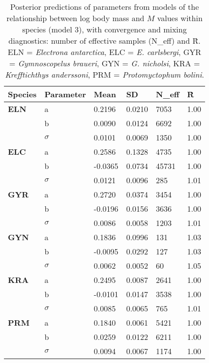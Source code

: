 \documentclass[12pt, titlepage]{article}
\begin{document}
\begin{table}[H]
\begin{center}
\caption{Posterior predictions of parameters from models of the relationship between log body mass and $M$ values within species (model 3), with convergence and mixing diagnostics: number of effective samples (N\_eff) and \^R. ELN = \textit{Electrona antarctica}, ELC = \textit{E. carlsbergi}, GYR = \textit{Gymnoscopelus braueri}, GYN = \textit{G. nicholsi}, KRA = \textit{Krefftichthys anderssoni}, PRM = \textit{Protomyctophum bolini}.}
\label{tab:SppW}

\def\arraystretch{1.5}
  \begin{tabular}{ | l | l | l | l | l | l |}
    \hline
    \textbf{Species} & \textbf{Parameter} & Mean & SD & N\_eff & \^R \\ \hline
    \textbf{ELN} & a & 0.2196 & 0.0210 & 7053 & 1.00 \\ \hline
    & b & 0.0090 & 0.0124 & 6692 & 1.00 \\ \hline
    & $\sigma$ & 0.0101 & 0.0069 & 1350 & 1.00 \\ \hline
    \textbf{ELC} & a & 0.2586 & 0.1328 & 4735 & 1.00 \\ \hline
    & b & -0.0365 & 0.0734 & 45731 & 1.00 \\ \hline
    & $\sigma$ & 0.0121 & 0.0096 & 285 & 1.01 \\ \hline
    \textbf{GYR} & a & 0.2720 & 0.0374 & 3454 & 1.00 \\ \hline
    & b & -0.0196 & 0.0156 & 3636 & 1.00 \\ \hline
    & $\sigma$ & 0.0086 & 0.0058 & 1203 & 1.01 \\ \hline
    \textbf{GYN} & a & 0.1836 & 0.0996 & 131 & 1.03 \\ \hline
    & b & -0.0095 & 0.0292 & 127 & 1.03 \\ \hline
    & $\sigma$ & 0.0062 & 0.0052 & 60 & 1.05 \\ \hline
    \textbf{KRA} & a & 0.2495 & 0.0087 & 2641 & 1.00 \\ \hline
    & b & -0.0101 & 0.0147 & 3538 & 1.00 \\ \hline
    & $\sigma$ & 0.0085 & 0.0065 & 765 & 1.01 \\ \hline
    \textbf{PRM} & a & 0.1840 & 0.0061 & 5421 & 1.00 \\ \hline
    & b & 0.0259 & 0.0122 & 6211 & 1.00 \\ \hline
    & $\sigma$ & 0.0094 & 0.0067 & 1174 & 1.00 \\
    \hline
  \end{tabular}
  \end{center}
\end{table}
\end{document}
